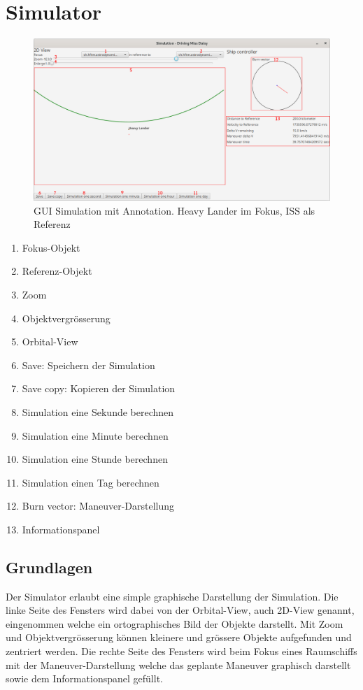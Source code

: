 \hypertarget{simulator}{\section{Simulator}}

\begin{figure}[H]
	\centering
	\includegraphics[width=\textwidth]{res/simulation.png}
	\caption[GUI Simulation mit Annotation]{GUI Simulation mit Annotation. Heavy Lander im Fokus, ISS als Referenz}
\end{figure}

\begin{enumerate}[noitemsep]
	\item Fokus-Objekt
	\item Referenz-Objekt
	\item Zoom
	\item Objektvergrösserung
	\item Orbital-View
	\item Save: Speichern der Simulation
	\item Save copy: Kopieren der Simulation
	\item Simulation eine Sekunde berechnen
	\item Simulation eine Minute berechnen
	\item Simulation eine Stunde berechnen
	\item Simulation einen Tag berechnen
	\item Burn vector: Maneuver-Darstellung
	\item Informationspanel
\end{enumerate}

\subsection{Grundlagen}
Der Simulator erlaubt eine simple graphische Darstellung der Simulation. Die linke Seite des Fensters wird dabei von der Orbital-View, auch 2D-View genannt, eingenommen welche ein ortographisches Bild der Objekte darstellt. Mit Zoom und Objektvergrösserung können kleinere und grössere Objekte aufgefunden und zentriert werden. Die rechte Seite des Fensters wird beim Fokus eines Raumschiffs mit der Maneuver-Darstellung welche das geplante Maneuver graphisch darstellt sowie dem Informationspanel gefüllt.

